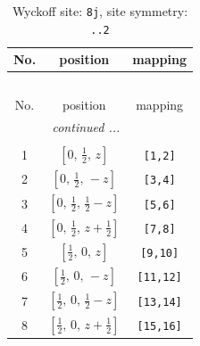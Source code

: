 \documentclass[fleqn,8pt]{jsarticle}
\begin{document}
\begin{longtable}{ccc}
\caption{Wyckoff site: {\tt 8j}, site symmetry: {\tt ..2}}
 \\
 \hline \hline
No. & position & mapping \\ \hline \endfirsthead

\multicolumn{2}{l}{\tablename\ \thetable{}} \\
 \hline \hline
No. & position & mapping \\ \hline \endhead

 \hline \hline
\multicolumn{2}{r}{\footnotesize\it continued ...} \\ \endfoot

 \hline \hline
\multicolumn{2}{r}{} \\ \endlastfoot

1 & $\left[ 0,\, \frac{1}{2},\, z \right]$ & {\tt [1,2]} \\ \hline
2 & $\left[ 0,\, \frac{1}{2},\, - z \right]$ & {\tt [3,4]} \\ \hline
3 & $\left[ 0,\, \frac{1}{2},\, \frac{1}{2} - z \right]$ & {\tt [5,6]} \\ \hline
4 & $\left[ 0,\, \frac{1}{2},\, z + \frac{1}{2} \right]$ & {\tt [7,8]} \\ \hline
5 & $\left[ \frac{1}{2},\, 0,\, z \right]$ & {\tt [9,10]} \\ \hline
6 & $\left[ \frac{1}{2},\, 0,\, - z \right]$ & {\tt [11,12]} \\ \hline
7 & $\left[ \frac{1}{2},\, 0,\, \frac{1}{2} - z \right]$ & {\tt [13,14]} \\ \hline
8 & $\left[ \frac{1}{2},\, 0,\, z + \frac{1}{2} \right]$ & {\tt [15,16]} \\
\end{longtable}
\renewcommand{\arraystretch}{1.2}
\end{document}
